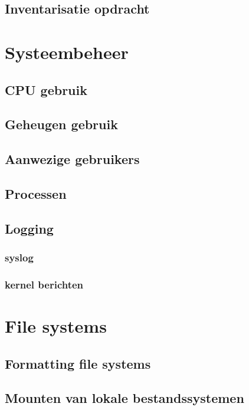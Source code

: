 \documentclass[a4paper,12pt,twoside,openright,titlepage]{book}
\begin{document}
\section{Inventarisatie opdracht}


\chapter{Systeembeheer}

\section{CPU gebruik}

\section{Geheugen gebruik}

\section{Aanwezige gebruikers}

\section{Processen}



\section{Logging}

\subsection{syslog}

\subsection{kernel berichten}


\chapter{File systems}

\section{Formatting file systems}

\section{Mounten van lokale bestandssystemen}

\end{document}
